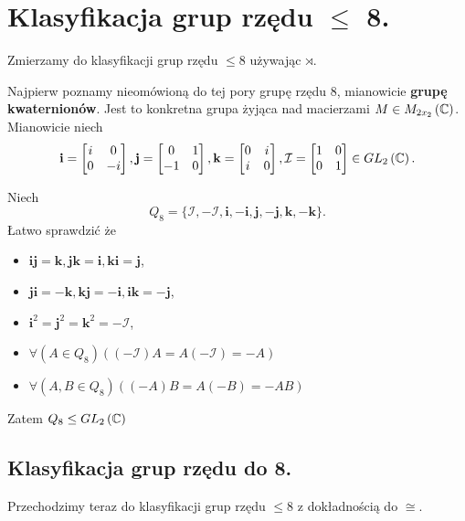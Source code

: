 \section{Klasyfikacja grup rzędu $\le $ 8.}

\begin{context}
Zmierzamy do klasyfikacji grup rzędu $\le 8$ używając $\rtimes$.
\end{context}

Najpierw poznamy nieomówioną do tej pory grupę rzędu 8, mianowicie \textbf{grupę kwaternionów}. Jest to konkretna grupa żyjąca nad macierzami $M\in M_{2x_2}\left( \mathbb{C} \right) $. Mianowicie niech
\[
	\mathbf{i} =\begin{bmatrix} i & 0 \\0&-i \end{bmatrix}, \mathbf{j} = \begin{bmatrix} 0&1 \\ -1& 0 \end{bmatrix}, \mathbf{k} = \begin{bmatrix} 0 & i \\ i & 0 \end{bmatrix}, \mathcal{I} = \begin{bmatrix} 1 & 0 \\ 0 & 1 \end{bmatrix}  \in GL_2\left( \mathbb{C} \right) 
.\] 

Niech \[
Q_{8} = \{\mathcal{I}, -\mathcal{I}, \mathbf{i} , -\mathbf{i}, \mathbf{j}, -\mathbf{j} , \mathbf{k}, -\mathbf{k}  \} 
.\] 
Łatwo sprawdzić że
\begin{itemize}
	\item $\mathbf{i} \mathbf{j} = \mathbf{k}, \mathbf{j} \mathbf{k} = \mathbf{i}, \mathbf{k} \mathbf{i} = \mathbf{j} $,
	\item $\mathbf{j} \mathbf{i} = -\mathbf{k}, \mathbf{k} \mathbf{j} = -\mathbf{i}, \mathbf{i} \mathbf{k} = -\mathbf{j} $,
	\item  $\mathbf{i} ^{2} = \mathbf{j} ^{2} = \mathbf{k} ^2 = -\mathcal{I}$,
	\item $\forall\left(A\in Q_8\right) \left( \left( -\mathcal{I} \right) A = A\left( -\mathcal{I} \right) = -A \right) $
	\item $\forall\left(A,B \in Q_8\right)\left( \left( -A \right) B = A\left( -B \right) = -AB \right)  $
\end{itemize}

Zatem $Q_8 \le GL_{2}\left( \mathbb{C} \right) $

\subsection*{Klasyfikacja grup rzędu do 8.}
\begin{context}
Przechodzimy teraz do klasyfikacji grup rzędu $\le 8$ z dokładnością do $\cong$.
\end{context}

